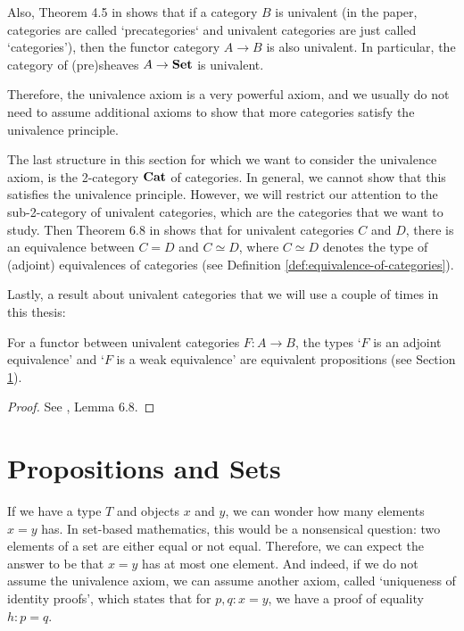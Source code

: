 Also, Theorem 4.5 in \autocite{univalent-categories} shows that if a category $ B $ is univalent (in the paper, categories are called `precategories` and univalent categories are just called `categories'), then the functor category $ A \rightarrow B $ is also univalent. In particular, the category of (pre)sheaves $ A \to \mathbf{Set} $ is univalent.

Therefore, the univalence axiom is a very powerful axiom, and we usually do not need to assume additional axioms to show that more categories satisfy the univalence principle.

The last structure in this section for which we want to consider the univalence axiom, is the 2-category $ \mathbf{Cat} $ of categories. In general, we cannot show that this satisfies the univalence principle. However, we will restrict our attention to the sub-2-category of univalent categories, which are the categories that we want to study. Then Theorem 6.8 in \autocite{univalent-categories} shows that for univalent categories $ C $ and $ D $, there is an equivalence between $ C = D $ and $ C \simeq D $, where $ C \simeq D $ denotes the type of (adjoint) equivalences of categories (see Definition \ref{def:equivalence-of-categories}).

Lastly, a result about univalent categories that we will use a couple of times in this thesis:
\begin{lemma}\label{lem:univalen-category-equivalence}
  For a functor between univalent categories $ F: A \to B $, the types `$ F $ is an adjoint equivalence' and `$ F $ is a weak equivalence' are equivalent propositions (see Section \ref{sec:homotopy-props-sets}).
\end{lemma}
\begin{proof}
  See \autocite{univalent-categories}, Lemma 6.8.
\end{proof}

\section{Propositions and Sets}\label{sec:homotopy-props-sets}
If we have a type $ T $ and objects $ x $ and $ y $, we can wonder how many elements $ x = y $ has. In set-based mathematics, this would be a nonsensical question: two elements of a set are either equal or not equal. Therefore, we can expect the answer to be that $ x = y $ has at most one element. And indeed, if we do not assume the univalence axiom, we can assume another axiom, called `uniqueness of identity proofs', which states that for $ p, q: x = y $, we have a proof of equality $ h: p = q $.

